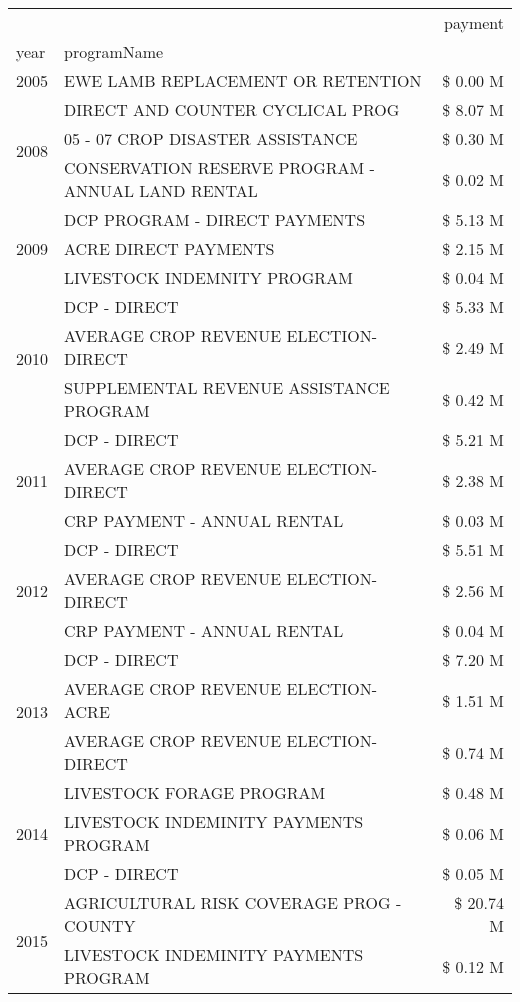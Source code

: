 \begin{tabular}{llr}
\toprule
 &  & payment \\
year & programName &  \\
\midrule
2005 & EWE LAMB REPLACEMENT OR RETENTION & \$ 0.00 M \\
\cline{1-3}
\multirow[t]{3}{*}{2008} & DIRECT AND COUNTER CYCLICAL PROG & \$ 8.07 M \\
 & 05 - 07 CROP DISASTER ASSISTANCE & \$ 0.30 M \\
 & CONSERVATION RESERVE PROGRAM - ANNUAL LAND RENTAL & \$ 0.02 M \\
\cline{1-3}
\multirow[t]{3}{*}{2009} & DCP PROGRAM - DIRECT PAYMENTS & \$ 5.13 M \\
 & ACRE DIRECT PAYMENTS & \$ 2.15 M \\
 & LIVESTOCK INDEMNITY PROGRAM & \$ 0.04 M \\
\cline{1-3}
\multirow[t]{3}{*}{2010} & DCP - DIRECT & \$ 5.33 M \\
 & AVERAGE CROP REVENUE ELECTION-DIRECT & \$ 2.49 M \\
 & SUPPLEMENTAL REVENUE ASSISTANCE PROGRAM & \$ 0.42 M \\
\cline{1-3}
\multirow[t]{3}{*}{2011} & DCP - DIRECT & \$ 5.21 M \\
 & AVERAGE CROP REVENUE ELECTION-DIRECT & \$ 2.38 M \\
 & CRP PAYMENT - ANNUAL RENTAL & \$ 0.03 M \\
\cline{1-3}
\multirow[t]{3}{*}{2012} & DCP - DIRECT & \$ 5.51 M \\
 & AVERAGE CROP REVENUE ELECTION-DIRECT & \$ 2.56 M \\
 & CRP PAYMENT - ANNUAL RENTAL & \$ 0.04 M \\
\cline{1-3}
\multirow[t]{3}{*}{2013} & DCP - DIRECT & \$ 7.20 M \\
 & AVERAGE CROP REVENUE ELECTION-ACRE & \$ 1.51 M \\
 & AVERAGE CROP REVENUE ELECTION-DIRECT & \$ 0.74 M \\
\cline{1-3}
\multirow[t]{3}{*}{2014} & LIVESTOCK FORAGE PROGRAM & \$ 0.48 M \\
 & LIVESTOCK INDEMINITY PAYMENTS PROGRAM & \$ 0.06 M \\
 & DCP - DIRECT & \$ 0.05 M \\
\cline{1-3}
\multirow[t]{3}{*}{2015} & AGRICULTURAL RISK COVERAGE PROG - COUNTY & \$ 20.74 M \\
 & LIVESTOCK INDEMINITY PAYMENTS PROGRAM & \$ 0.12 M \\

\end{tabular}
